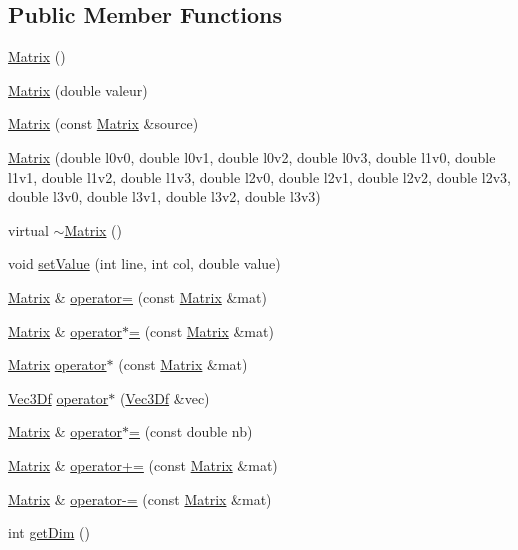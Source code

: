 \subsection*{Public Member Functions}
\begin{DoxyCompactItemize}
\item 
\hyperlink{class_matrix_a2dba13c45127354c9f75ef576f49269b}{Matrix} ()
\item 
\hyperlink{class_matrix_a7fc5559ca322edcad4e74748cc21a212}{Matrix} (double valeur)
\item 
\hyperlink{class_matrix_a1852c311c6669c1d7073ca79db5fced3}{Matrix} (const \hyperlink{class_matrix}{Matrix} \&source)
\item 
\hyperlink{class_matrix_aae556b9970532484d24ac438b94d9e14}{Matrix} (double l0v0, double l0v1, double l0v2, double l0v3, double l1v0, double l1v1, double l1v2, double l1v3, double l2v0, double l2v1, double l2v2, double l2v3, double l3v0, double l3v1, double l3v2, double l3v3)
\item 
virtual \hyperlink{class_matrix_a9b1c3627f573d78a2f08623fdfef990f}{$\sim$Matrix} ()
\item 
void \hyperlink{class_matrix_a0945de041689d520fb614b6af735ab90}{setValue} (int line, int col, double value)
\item 
\hyperlink{class_matrix}{Matrix} \& \hyperlink{class_matrix_a3655359b1f9451cb7b589c3a9bc5c7f0}{operator=} (const \hyperlink{class_matrix}{Matrix} \&mat)
\item 
\hyperlink{class_matrix}{Matrix} \& \hyperlink{class_matrix_a51f8f6f7eca7e0a03b93d7e9594fa08b}{operator$\ast$=} (const \hyperlink{class_matrix}{Matrix} \&mat)
\item 
\hyperlink{class_matrix}{Matrix} \hyperlink{class_matrix_af36b762320602082b82e7b8b7d4a93c8}{operator$\ast$} (const \hyperlink{class_matrix}{Matrix} \&mat)
\item 
\hyperlink{class_vec3_d}{Vec3Df} \hyperlink{class_matrix_aba65fb54d9b60c6cc6738b45c88cada0}{operator$\ast$} (\hyperlink{class_vec3_d}{Vec3Df} \&vec)
\item 
\hyperlink{class_matrix}{Matrix} \& \hyperlink{class_matrix_a270dd27392c9508623e254e490768f73}{operator$\ast$=} (const double nb)
\item 
\hyperlink{class_matrix}{Matrix} \& \hyperlink{class_matrix_a925081e50122da1db2fe6a200035f665}{operator+=} (const \hyperlink{class_matrix}{Matrix} \&mat)
\item 
\hyperlink{class_matrix}{Matrix} \& \hyperlink{class_matrix_aa4364ebd7bb6a94176c7b7a79ab42c16}{operator-\/=} (const \hyperlink{class_matrix}{Matrix} \&mat)
\item 
int \hyperlink{class_matrix_a3507ab550914cdd7170e138a0cbd823a}{getDim} ()
\end{DoxyCompactItemize}
